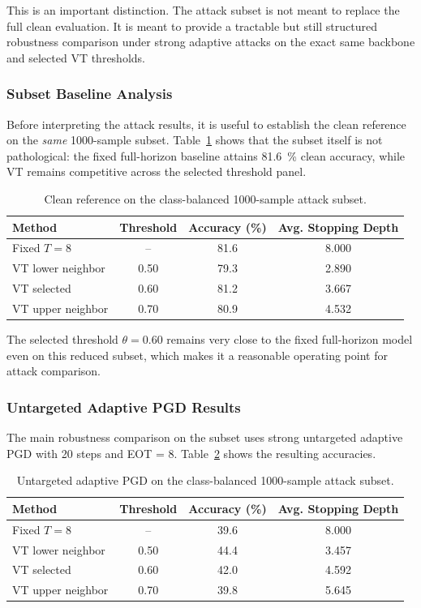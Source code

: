 \documentclass[11pt]{article}
\begin{document}
This is an important distinction. The attack subset is not meant to replace the full clean evaluation. It is meant to provide a tractable but still structured robustness comparison under strong adaptive attacks on the exact same backbone and selected VT thresholds.

\subsubsection{Subset Baseline Analysis}
Before interpreting the attack results, it is useful to establish the clean reference on the \emph{same} 1000-sample subset. Table~\ref{tab:attack-subset-clean} shows that the subset itself is not pathological: the fixed full-horizon baseline attains \SI{81.6}{\percent} clean accuracy, while VT remains competitive across the selected threshold panel.

\begin{table}[h]
\centering
\caption{Clean reference on the class-balanced 1000-sample attack subset.}
\label{tab:attack-subset-clean}
\begin{tabular}{lccc}
\toprule
Method & Threshold & Accuracy (\%) & Avg. Stopping Depth \\
\midrule
Fixed $T=8$ & -- & 81.6 & 8.000 \\
VT lower neighbor & 0.50 & 79.3 & 2.890 \\
VT selected & 0.60 & 81.2 & 3.667 \\
VT upper neighbor & 0.70 & 80.9 & 4.532 \\
\bottomrule
\end{tabular}
\end{table}

The selected threshold \(\theta = 0.60\) remains very close to the fixed full-horizon model even on this reduced subset, which makes it a reasonable operating point for attack comparison.

\subsubsection{Untargeted Adaptive PGD Results}
The main robustness comparison on the subset uses strong untargeted adaptive PGD with 20 steps and EOT = 8. Table~\ref{tab:attack-untargeted} shows the resulting accuracies.

\begin{table}[h]
\centering
\caption{Untargeted adaptive PGD on the class-balanced 1000-sample attack subset.}
\label{tab:attack-untargeted}
\begin{tabular}{lccc}
\toprule
Method & Threshold & Accuracy (\%) & Avg. Stopping Depth \\
\midrule
Fixed $T=8$ & -- & 39.6 & 8.000 \\
VT lower neighbor & 0.50 & 44.4 & 3.457 \\
VT selected & 0.60 & 42.0 & 4.592 \\
VT upper neighbor & 0.70 & 39.8 & 5.645 \\
\bottomrule
\end{tabular}
\end{table}
\end{document}
